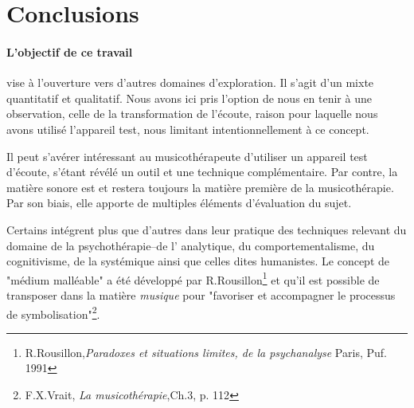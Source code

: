  
 
  



\section{Conclusions}

\label{Conclusions}

\paragraph{L'objectif de ce travail} vise à l'ouverture vers d'autres
domaines d'exploration. 
  Il s'agit d'un mixte quantitatif et qualitatif. Nous avons ici pris
  l'option de nous en tenir à une
  observation, celle de la transformation de l'écoute, raison pour
  laquelle nous avons utilisé l'appareil test, nous limitant intentionnellement
  à ce concept.
  
  Il peut s'avérer intéressant au musicothérapeute d'utiliser un
        appareil test d'écoute, s'étant révélé un outil et une
        technique complémentaire. Par contre, la matière sonore est et
        restera toujours la matière première de la  musicothérapie. 
 Par son biais, elle  apporte de multiples éléments d'évaluation du
 sujet.
 
 Certains  intégrent plus que d'autres dans leur pratique des techniques relevant du domaine de la psychothérapie--de l' analytique, 
  du comportementalisme, du cognitivisme, de la  systémique ainsi que
  celles dites humanistes.  Le concept de "médium malléable" a été
  développé par  R.Rousillon\footnote{R.Rousillon,\textit{Paradoxes et situations limites,  
  		de la psychanalyse} Paris, Puf. 1991} 
  et qu'il est possible de transposer dans la matière \textit{musique} 
  pour "favoriser et accompagner le processus 
  de symbolisation"\footnote{F.X.Vrait, \textit{La musicothérapie},Ch.3, p. 112}.


